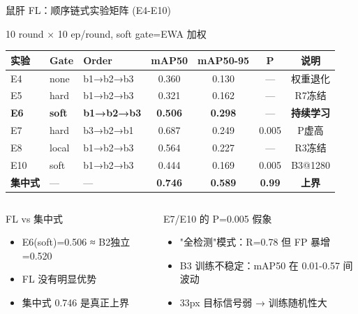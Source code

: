 \documentclass[aspectratio=169, 10pt]{beamer}
\begin{document}
\begin{frame}{鼠肝 FL：顺序链式实验矩阵 (E4-E10)}
  \begin{block}{10 round × 10 ep/round, soft gate=EWA 加权}
    \begin{tabular}{lllcccc}
      \toprule
      \textbf{实验} & \textbf{Gate} & \textbf{Order} & \textbf{mAP50} & \textbf{mAP50-95} & \textbf{P} & \textbf{说明} \\
      \midrule
      E4 & none & b1→b2→b3 & 0.360 & 0.130 & — & 权重退化 \\
      E5 & hard & b1→b2→b3 & 0.321 & 0.162 & — & R7冻结 \\
      \textbf{E6} & \textbf{soft} & \textbf{b1→b2→b3} & \textbf{0.506} & \textbf{0.298} & — & \textbf{持续学习} \\
      E7 & hard & b3→b2→b1 & 0.687 & 0.249 & \alert{0.005} & P虚高 \\
      E8 & local & b1→b2→b3 & 0.564 & 0.227 & — & R3冻结 \\
      E10 & soft & b1→b2→b3 & 0.444 & 0.169 & \alert{0.005} & B3@1280 \\
      \midrule
      \textbf{集中式} & — & — & \textbf{0.746} & \textbf{0.589} & \textbf{0.99} & \textbf{上界} \\
      \bottomrule
    \end{tabular}
  \end{block}
  \vspace{0em}
  \begin{columns}[T]
    \begin{block}{FL vs 集中式}
      \begin{itemize}
        \item E6(soft)=0.506 ≈ B2独立=0.520
        \item FL 没有明显优势
        \item 集中式 0.746 是真正上界
      \end{itemize}
    \end{block}
    \begin{alertblock}{E7/E10 的 P=0.005 假象}
      \begin{itemize}
        \item "全检测"模式：R=0.78 但 FP 暴增
        \item B3 训练不稳定：mAP50 在 0.01-0.57 间波动
        \item 33px 目标信号弱 → 训练随机性大
      \end{itemize}
    \end{alertblock}
  \end{columns}
\end{frame}
\end{document}

